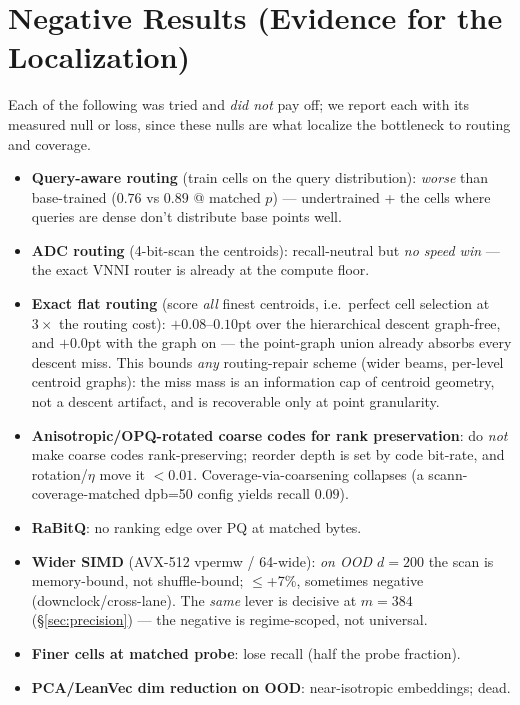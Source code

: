 \documentclass{article}
\begin{document}
\section{Negative Results (Evidence for the Localization)}
\label{sec:neg}
Each of the following was tried and \emph{did not} pay off; we report each with its
measured null or loss, since these nulls are what localize the bottleneck to routing
and coverage.
\begin{itemize}
  \item \textbf{Query-aware routing} (train cells on the query distribution):
    \emph{worse} than base-trained ($0.76$ vs $0.89$ @ matched $p$) --- undertrained
    + the cells where queries are dense don't distribute base points well.
  \item \textbf{ADC routing} (4-bit-scan the centroids): recall-neutral but
    \emph{no speed win} --- the exact VNNI router is already at the compute floor.
  \item \textbf{Exact flat routing} (score \emph{all} finest centroids, i.e.\ perfect cell
    selection at $3{\times}$ the routing cost): $+0.08$--$0.10$pt over the hierarchical
    descent graph-free, and $+0.0$pt with the graph on --- the point-graph union already
    absorbs every descent miss. This bounds \emph{any} routing-repair scheme (wider beams,
    per-level centroid graphs): the miss mass is an information cap of centroid geometry,
    not a descent artifact, and is recoverable only at point granularity.
  \item \textbf{Anisotropic/OPQ-rotated coarse codes for rank preservation}: do
    \emph{not} make coarse codes rank-preserving; reorder depth is set by code
    bit-rate, and rotation/$\eta$ move it $<0.01$. Coverage-via-coarsening collapses
    (a scann-coverage-matched dpb=50 config yields recall $0.09$).
  \item \textbf{RaBitQ}: no ranking edge over PQ at matched bytes.
  \item \textbf{Wider SIMD} (AVX-512 vpermw / 64-wide): \emph{on OOD $d{=}200$}
    the scan is memory-bound, not shuffle-bound; $\le$+7\%, sometimes negative
    (downclock/cross-lane). The \emph{same} lever is decisive at $m{=}384$
    (\S\ref{sec:precision}) --- the negative is regime-scoped, not universal.
  \item \textbf{Finer cells at matched probe}: lose recall (half the probe fraction).
  \item \textbf{PCA/LeanVec dim reduction on OOD}: near-isotropic embeddings; dead.

\end{itemize}
\end{document}
